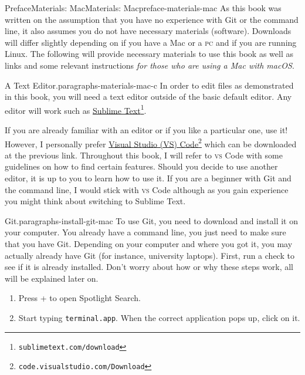 \documentclass[oneside,10pt,]{book}
\newcommand{\mono}[1]{\texttt{#1}}
\newcommand{\initialism}[1]{\textsc{\MakeLowercase{#1}}}
\newcommand{\kbd}[1]{\keys{{#1}}}
\begin{document}
%
%
\typeout{************************************************}
\typeout{************************************************}
%
\begin{preface}{Preface}{Materials: Mac}{}{Materials: Mac}{}{}{preface-materials-mac}
As this book was written on the assumption that you have no experience with Git or the command line, it also assumes you do not have necessary materials (software). Downloads will differ slightly depending on if you have a Mac or a \initialism{PC} and if you are running Linux. The following will provide necessary materials to use this book as well as links and some relevant instructions \emph{for those who are using a Mac with macOS}.%
\begin{paragraphs}{A Text Editor.}{paragraphs-materials-mac-c}%
In order to edit files as demonstrated in this book, you will need a text editor outside of the basic default editor. Any editor will work such as \href{https://www.sublimetext.com/download}{Sublime Text}\footnote{\nolinkurl{sublimetext.com/download}\label{fn-materials-mac-c-b-b}}.%
\par
If you are already familiar with an editor or if you like a particular one, use it! However, I personally prefer \href{https://code.visualstudio.com/Download}{Visual Studio (VS) Code}\footnote{\nolinkurl{code.visualstudio.com/Download}\label{fn-materials-mac-c-c-b}} which can be downloaded at the previous link. Throughout this book, I will refer to \initialism{VS} Code with some guidelines on how to find certain features. Should you decide to use another editor, it is up to you to learn how to use it. If you are a beginner with Git and the command line, I would stick with \initialism{VS} Code although as you gain experience you might think about switching to Sublime Text.%
\end{paragraphs}%
\begin{paragraphs}{Git.}{paragraphs-install-git-mac}%
To use Git, you need to download and install it on your computer. You already have a command line, you just need to make sure that you have Git. Depending on your computer and where you got it, you may actually already have Git (for instance, university laptops). First, run a check to see if it is already installed. Don't worry about how or why these steps work, all will be explained later on.%
\begin{enumerate}
\item{}Press \kbd{Command} + \kbd{Space} to open Spotlight Search.%
\item{}Start typing \mono{terminal.app}. When the correct application pops up, click on it.%

\end{enumerate}
\end{paragraphs}
\end{preface}
\end{document}
